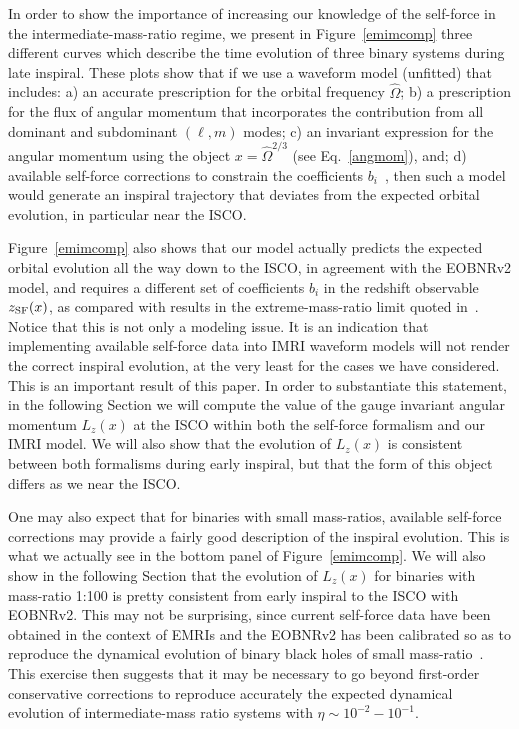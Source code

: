 In order to show the importance of increasing our knowledge of the self-force in the intermediate-mass-ratio regime, we present in Figure~\ref{emimcomp}  three different curves which describe the time evolution of three binary systems during late inspiral. These plots show that if we use a waveform model (unfitted) that includes: a) an accurate prescription for the orbital frequency \(\hat\Omega\); b) a prescription for the flux of angular momentum that incorporates the contribution from all dominant and subdominant \((\ell,m)\) modes; c) an invariant expression for the angular momentum using the object \(x=\hat\Omega^{2/3}\) (see  Eq.~\eqref{angmom}), and; d) available self-force corrections to constrain the coefficients \(b_i\)~\cite{barus}, then such a model would generate an inspiral trajectory that deviates from the expected orbital evolution, in particular near the ISCO. 


Figure~\ref{emimcomp} also shows that our model actually predicts the expected orbital evolution all the way down to the ISCO, in agreement with the EOBNRv2 model, and requires a different set of coefficients  \(b_i\) in the redshift observable \(z_{\rm SF} (x)\), as compared with results in the extreme-mass-ratio limit quoted in~\cite{barus}. Notice that this is not only a modeling issue. It is an indication that implementing available self-force data into IMRI waveform models will not render the correct inspiral evolution, at the very  least for the cases we have considered. This is an important result of this paper. In order to substantiate this statement, in the following Section we will compute the value of the gauge invariant angular momentum \(L_z(x)\) at the ISCO within both the self-force formalism and our IMRI model. We will also show that the evolution of \(L_z(x)\) is consistent between both formalisms during early inspiral, but that the form of this object differs as we near the ISCO.  

One may also expect that for binaries with small mass-ratios, available self-force corrections may provide a fairly good description of the inspiral evolution. This is what we actually see in the bottom panel of Figure~\ref{emimcomp}. We will also show in the following Section that the evolution of \(L_z(x)\) for binaries with mass-ratio 1:100 is pretty consistent from early inspiral to the ISCO with EOBNRv2. This may not be surprising, since current self-force data have been obtained in the context of EMRIs and the EOBNRv2 has been calibrated so as to reproduce the dynamical evolution of binary black holes of small mass-ratio~\cite{resu,raci,nic,nic1}. This exercise then suggests that it may be necessary to go beyond first-order conservative corrections to reproduce accurately the expected dynamical evolution of intermediate-mass ratio systems with \(\eta \sim 10^{-2}-10^{-1}\).



